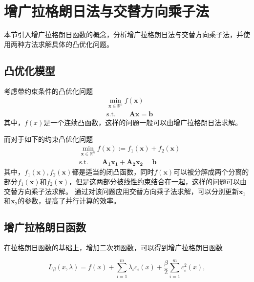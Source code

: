 \section{增广拉格朗日法与交替方向乘子法}

本节引入增广拉格朗日函数的概念，分析增广拉格朗日法\cite{1976AugLagrange}与交替方向乘子法\cite{1975ADMMBook}，并使用两种方法求解具体的凸优化问题。

\subsection{凸优化模型}

考虑带约束条件的凸优化问题
\begin{equation}\label{eq_admm_1}
    \begin{split}
        &\min\limits_{\bm{x}\in \mathbb{R}^{n}} f(\bm{x}) \\
        &\mathrm{s. t.} \quad\quad \bm{Ax} = \bm{b}
    \end{split}
\end{equation}
其中，$f(x)$是一个连续凸函数，这样的问题一般可以由增广拉格朗日法求解。

而对于如下的约束凸优化问题
\begin{equation}\label{eq_admm_2}
    \begin{split}
        &\min\limits_{\bm{x}\in \mathbb{R}^{n}} f(\bm{x}) := f_{1}(\bm{x}) + f_{2}(\bm{x}) \\
        &\mathrm{s. t.} \quad\quad \bm{A_{1}x_{1}} + \bm{A_{2}x_{2}} = \bm{b} 
    \end{split}
\end{equation}
其中，$f_{1}(\bm{x}), f_{2}(\bm{x})$都是适当的闭凸函数，同时$f(\bm{x})$可以被分解成两个分离的部分$f_{1}(\bm{x})$和$f_{2}(\bm{x})$，但是这两部分被线性约束结合在一起，这样的问题可以由交替方向乘子法求解。
通过对该问题应用交替方向乘子法求解，可以分别更新$\bm{x}_{1}$和$\bm{x}_{2}$的参数，提高了并行计算的效率。

\subsection{增广拉格朗日函数}

在拉格朗日函数的基础上，增加二次罚函数，可以得到增广拉格朗日函数

\begin{equation}\label{eq_admm_3}
    L_{\beta}(x, \lambda) = f(x) + \sum_{i=1}^{m}\lambda_{i} c_{i}(x) + \frac{\beta}{2}\sum_{i=1}^{m}c_{i}^{2}(x),
\end{equation}

